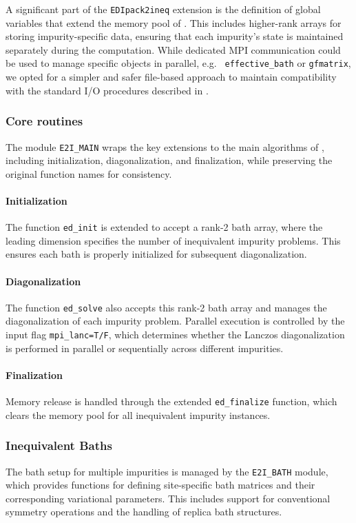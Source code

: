 \documentclass[edipack2.tex]{subfiles}
\begin{document}
A significant part of the {\tt EDIpack2ineq} extension is the 
definition of global variables that extend the memory pool of 
\NAME. This includes higher-rank arrays for storing impurity-specific 
data, ensuring that each impurity's state is maintained separately 
during the computation. While dedicated MPI communication could be 
used to manage specific objects in parallel, e.g. {\tt
  effective\_bath} or {\tt gfmatrix}, we opted for a simpler and safer  
file-based approach to maintain compatibility with the standard I/O 
procedures described in .


\subsubsection{Core routines}\label{ssSecIneqGlobal}
The module {\tt E2I\_MAIN} wraps the key extensions to the main 
algorithms of \NAME, including initialization, diagonalization, and 
finalization, while preserving the original function names for 
consistency. 

\paragraph{\bf Initialization} The function {\tt ed\_init} is extended to 
  accept a rank-2 bath array, where the leading dimension specifies 
  the number of inequivalent impurity problems. This ensures each bath 
  is properly initialized for subsequent diagonalization.

\paragraph{\bf Diagonalization} The function {\tt ed\_solve} also accepts this 
  rank-2 bath array and manages the diagonalization of each impurity 
  problem. Parallel execution is controlled by the input flag 
  {\tt mpi\_lanc=T/F}, which determines whether the Lanczos 
  diagonalization is performed in parallel or sequentially across 
  different impurities.

\paragraph{\bf Finalization} Memory release is handled through the extended 
{\tt ed\_finalize} function, which clears the memory pool for all 
inequivalent impurity instances.

  


\subsubsection{Inequivalent Baths}\label{ssSecIneqBath}
The bath setup for multiple impurities is managed by the 
{\tt E2I\_BATH} module, which provides functions for defining 
site-specific bath matrices and their corresponding variational 
parameters. This includes support for conventional symmetry operations 
and the handling of replica bath structures. 
\end{document}
